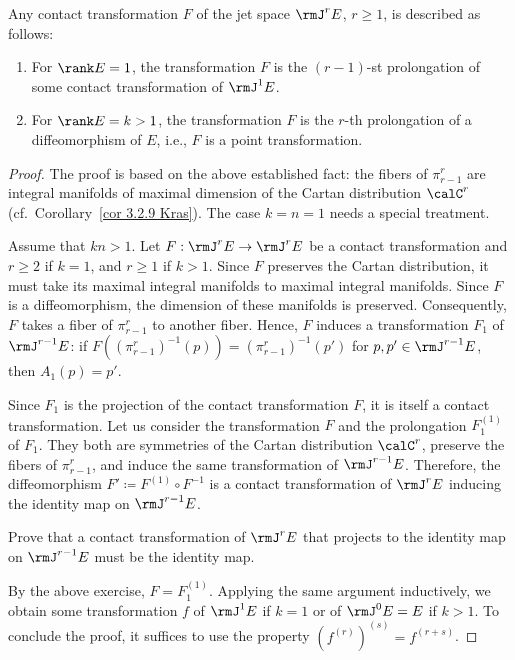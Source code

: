 \begin{thm}\label{thm 3.3.1 Kras}
    Any contact transformation $F$ of the jet space $\rmJ^rE$, $r\geq 1$, is described as follows:
    \begin{enumerate}
        \item For $\rank E=1$, the transformation $F$ is the $(r-1)$-st prolongation of some contact transformation of $\rmJ^1E$.
        \item For $\rank E=k>1$, the transformation $F$ is the $r$-th prolongation of a diffeomorphism of $E$, i.e., $F$ is a point transformation.
    \end{enumerate}
\end{thm}
\begin{proof}
    The proof is based on the above established fact: the fibers of $\pi^r_{r-1}$ are integral manifolds of maximal dimension of the Cartan distribution $\calC^r$ (cf.\ Corollary~\ref{cor 3.2.9 Kras}). The case $k=n=1$ needs a special treatment.

    Assume that $kn>1$. Let $F:\rmJ^rE\to \rmJ^rE$ be a contact transformation and $r\geq 2$ if $k=1$, and $r\geq 1$ if $k>1$. Since $F$ preserves the Cartan distribution, it must take its maximal integral manifolds to maximal integral manifolds. Since $F$ is a diffeomorphism, the dimension of these manifolds is preserved. Consequently, $F$ takes a fiber of $\pi^r_{r-1}$ to another fiber. Hence, $F$ induces a transformation $F_1$ of $\rmJ^{r-1}E$: if $F\left((\pi^r_{r-1})^{-1}(p)\right)=(\pi^r_{r-1})^{-1}(p')$ for $p,p'\in\rmJ^{r-1}E$, then $A_1(p)=p'$.

    Since $F_1$ is the projection of the contact transformation $F$, it is itself a contact transformation. Let us consider the transformation $F$ and the prolongation $F_1^{(1)}$ of $F_1$. They both are symmetries of the Cartan distribution $\calC^r$, preserve the fibers of $\pi^r_{r-1}$, and induce the same transformation of $\rmJ^{r-1}E$. Therefore, the diffeomorphism $F'\coloneqq F^{(1)}\circ F^{-1}$ is a contact transformation of $\rmJ^rE$ inducing the identity map on $\rmJ^{r-1}E$.

    \begin{xca}
        Prove that a contact transformation of $\rmJ^rE$ that projects to the identity map on $\rmJ^{r-1}E$ must be the identity map.
    \end{xca}

    By the above exercise, $F=F_1^{(1)}$. Applying the same argument inductively, we obtain some transformation $f$ of $\rmJ^1E$ if $k=1$ or of $\rmJ^0E=E$ if $k>1$. To conclude the proof, it suffices to use the property $(f^{(r)})^{(s)}=f^{(r+s)}$.


\end{proof}
